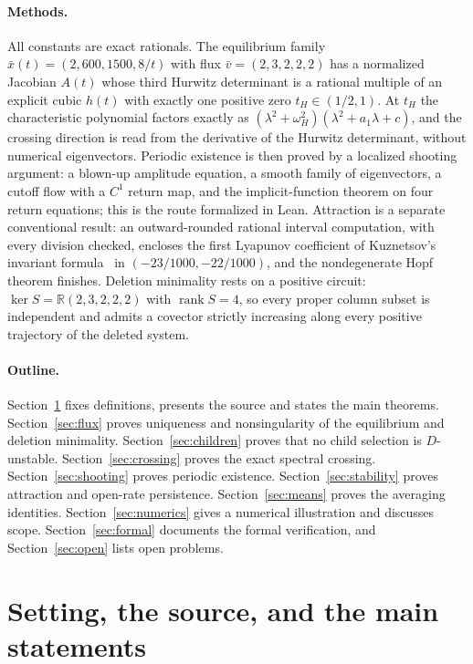 \documentclass[11pt,a4paper]{article}
\theoremstyle{plain}
\theoremstyle{definition}
\theoremstyle{remark}
\newcommand{\R}{\mathbb{R}}
\newcommand{\xbar}{\bar x}
\newcommand{\vbar}{\bar v}
\begin{document}
\paragraph{Methods.}
All constants are exact rationals. The equilibrium family $\xbar(t)=(2,600,1500,8/t)$ with flux $\vbar=(2,3,2,2,2)$ has a normalized Jacobian $A(t)$ whose third Hurwitz determinant is a rational multiple of an explicit cubic $h(t)$ with exactly one positive zero $t_H\in(1/2,1)$. At $t_H$ the characteristic polynomial factors exactly as $(\lambda^2+\omega_H^2)(\lambda^2+a_1\lambda+c)$, and the crossing direction is read from the derivative of the Hurwitz determinant, without numerical eigenvectors. Periodic existence is then proved by a localized shooting argument: a blown-up amplitude equation, a smooth family of eigenvectors, a cutoff flow with a $C^1$ return map, and the implicit-function theorem on four return equations; this is the route formalized in Lean. Attraction is a separate conventional result: an outward-rounded rational interval computation, with every division checked, encloses the first Lyapunov coefficient of Kuznetsov's invariant formula~\cite[\S5.4]{Kuznetsov2004} in $(-23/1000,-22/1000)$, and the nondegenerate Hopf theorem finishes. Deletion minimality rests on a positive circuit: $\ker S=\R(2,3,2,2,2)$ with $\operatorname{rank}S=4$, so every proper column subset is independent and admits a covector strictly increasing along every positive trajectory of the deleted system.

\paragraph{Outline.}
Section~\ref{sec:setting} fixes definitions, presents the source and states the main theorems. Section~\ref{sec:flux} proves uniqueness and nonsingularity of the equilibrium and deletion minimality. Section~\ref{sec:children} proves that no child selection is $D$-unstable. Section~\ref{sec:crossing} proves the exact spectral crossing. Section~\ref{sec:shooting} proves periodic existence. Section~\ref{sec:stability} proves attraction and open-rate persistence. Section~\ref{sec:means} proves the averaging identities. Section~\ref{sec:numerics} gives a numerical illustration and discusses scope. Section~\ref{sec:formal} documents the formal verification, and Section~\ref{sec:open} lists open problems.

\section{Setting, the source, and the main statements}\label{sec:setting}
\end{document}
